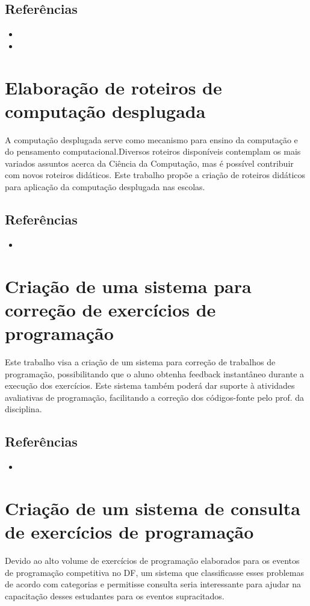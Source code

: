 \documentclass{article}
\begin{document}
\subsection*{Referências}

\begin{itemize}
	\item {}
	\item {}
\end{itemize}


\section*{Elaboração de roteiros de computação desplugada}

A computação desplugada serve como mecanismo para ensino da computação e do pensamento computacional.Diversos roteiros disponíveis contemplam os mais variados assuntos acerca da Ciência da Computação, mas é possível contribuir com novos roteiros didáticos. Este trabalho propõe a criação de roteiros didáticos para aplicação da computação desplugada nas escolas.

\subsection*{Referências}

\begin{itemize}
	\item {}
\end{itemize}


\section*{Criação de uma sistema para correção de exercícios de programação}

Este trabalho visa a criação de um sistema para correção de trabalhos de programação, possibilitando que o aluno obtenha feedback instantâneo durante a execução dos exercícios. Este sistema também poderá dar suporte à atividades avaliativas de programação, facilitando a correção dos códigos-fonte pelo prof. da disciplina.

\subsection*{Referências}

\begin{itemize}
	\item {}
\end{itemize}

\section*{Criação de um sistema de consulta de exercícios de programação}

Devido ao alto volume de exercícios de programação elaborados para os eventos de programação competitiva no DF, um sistema que classificasse esses problemas de acordo com categorias e permitisse consulta seria interessante para ajudar na capacitação desses estudantes para os eventos supracitados.
\end{document}
